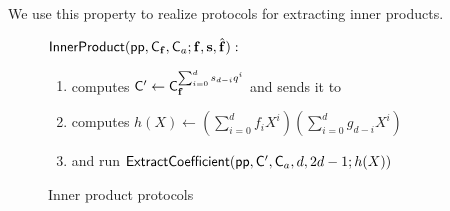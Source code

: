 \documentclass{article}
\theoremstyle{definition}
\begin{document}
We use this property to realize protocols for extracting inner products.

\begin{figure}[!htp]
\renewcommand{\figurename}{Protocol}
\caption{Inner product protocols} \label{scheme:inner product}
\noindent\begin{mdframed}[userdefinedwidth=\textwidth]
\begin{minipage}{\textwidth}
	\begin{flushleft}
	$\textsf{{InnerProduct}}(\textsf{pp}, \mathsf{C}_\mathbf{f}, \mathsf{C}_a; \mathbf{f}, \mathbf{s}, \hat{\mathbf{f}}):$ 
		\begin{enumerate}[nolistsep]
		    \item \prover computes $\mathsf{C}' \gets \mathsf{C}_\mathbf{f}^{\sum_{i=0}^{d} s_{d-i} q^i}$ and sends it to \verifier
		    \item \prover computes $h(X) \gets \left(\sum_{i=0}^d f_i X^i\right) \left(\sum_{i=0}^d g_{d-i} X^i\right)$
		    \item \prover and \verifier run $\textsf{{ExtractCoefficient}}(\textsf{pp}, \mathsf{C}', \mathsf{C}_a, d, 2d-1; h(X))$
		\end{enumerate}
	\end{flushleft}
\end{minipage}
\end{mdframed}
\end{figure}
\end{document}
